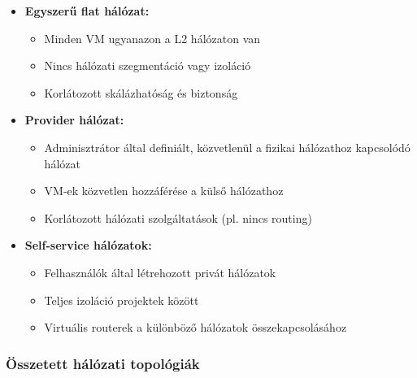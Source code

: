 \documentclass[a4paper,12pt]{article}
\begin{document}
    \begin{itemize}
        \item \textbf{Egyszerű flat hálózat:}
        \begin{itemize}
            \item Minden VM ugyanazon a L2 hálózaton van
            \item Nincs hálózati szegmentáció vagy izoláció
            \item Korlátozott skálázhatóság és biztonság
        \end{itemize}

        \item \textbf{Provider hálózat:}
        \begin{itemize}
            \item Adminisztrátor által definiált, közvetlenül a fizikai hálózathoz kapcsolódó hálózat
            \item VM-ek közvetlen hozzáférése a külső hálózathoz
            \item Korlátozott hálózati szolgáltatások (pl. nincs routing)
        \end{itemize}

        \item \textbf{Self-service hálózatok:}
        \begin{itemize}
            \item Felhasználók által létrehozott privát hálózatok
            \item Teljes izoláció projektek között
            \item Virtuális routerek a különböző hálózatok összekapcsolásához
        \end{itemize}
    \end{itemize}

    \subsubsection{Összetett hálózati topológiák}
\end{document}

